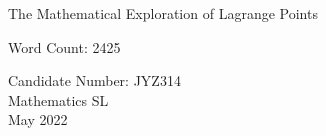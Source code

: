 \begin{titlepage}
	\begin{center}
		\vspace*{\fill}
		
		The Mathematical Exploration of Lagrange Points
		
		\vspace*{1.0cm}
		Word Count: 2425
		
		\vfill
		
		Candidate Number: JYZ314\\
		Mathematics SL \\
		May 2022
		
		\vspace*{\fill}
		
	\end{center}
\end{titlepage}
